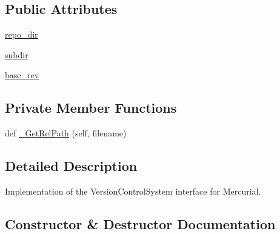 \subsection*{Public Attributes}
\begin{DoxyCompactItemize}
\item 
\mbox{\hyperlink{classgoogletest-master_1_1googlemock_1_1scripts_1_1upload_1_1_mercurial_v_c_s_a1d2be9c159d5a3f8fec3eea949699fb7}{repo\+\_\+dir}}
\item 
\mbox{\hyperlink{classgoogletest-master_1_1googlemock_1_1scripts_1_1upload_1_1_mercurial_v_c_s_ab23199d06b1ee537e8a335721ccaa1c7}{subdir}}
\item 
\mbox{\hyperlink{classgoogletest-master_1_1googlemock_1_1scripts_1_1upload_1_1_mercurial_v_c_s_a9e3660fbf54f16b181c7a23ed9d87916}{base\+\_\+rev}}
\end{DoxyCompactItemize}
\subsection*{Private Member Functions}
\begin{DoxyCompactItemize}
\item 
def \mbox{\hyperlink{classgoogletest-master_1_1googlemock_1_1scripts_1_1upload_1_1_mercurial_v_c_s_a79ea968d9efda367ece83ea85510990d}{\+\_\+\+Get\+Rel\+Path}} (self, filename)
\end{DoxyCompactItemize}


\subsection{Detailed Description}
\begin{DoxyVerb}Implementation of the VersionControlSystem interface for Mercurial.\end{DoxyVerb}
 

\subsection{Constructor \& Destructor Documentation}
\mbox{\label{classgoogletest-master_1_1googlemock_1_1scripts_1_1upload_1_1_mercurial_v_c_s_a40ef1d1ee1ac8ada1de7e4189cb76289}} 
